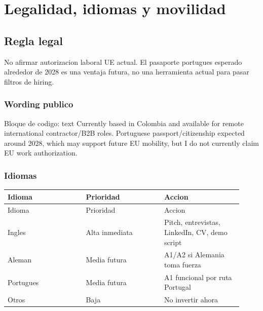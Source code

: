 \chapter{Legalidad, idiomas y movilidad}

\section{Regla legal}


No afirmar autorizacion laboral UE actual. El pasaporte portugues esperado alrededor de 2028 es una ventaja futura, no una herramienta actual para pasar filtros de hiring.


\subsection{Wording publico}


\begin{mdcode}
Bloque de codigo: text
Currently based in Colombia and available for remote international contractor/B2B roles. Portuguese passport/citizenship expected around 2028, which may support future EU mobility, but I do not currently claim EU work authorization.
\end{mdcode}


\subsection{Idiomas}


\begin{center}
\scriptsize
\begin{longtable}{>{\raggedright\arraybackslash}p{0.305\linewidth} >{\raggedright\arraybackslash}p{0.305\linewidth} >{\raggedright\arraybackslash}p{0.305\linewidth}}
\toprule
Idioma & Prioridad & Accion \\
\midrule
\endfirsthead
\toprule
Idioma & Prioridad & Accion \\
\midrule
\endhead
Ingles & Alta inmediata & Pitch, entrevistas, LinkedIn, CV, demo script \\
Aleman & Media futura & A1/A2 si Alemania toma fuerza \\
Portugues & Media futura & A1 funcional por ruta Portugal \\
Otros & Baja & No invertir ahora \\
\bottomrule
\end{longtable}
\end{center}



